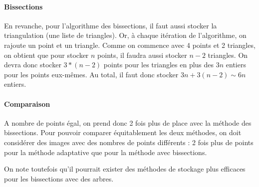 \documentclass{report}
\begin{document}
\paragraph{Bissections}

En revanche, pour l'algorithme des bissections, il faut aussi stocker la triangulation (une liste de triangles). Or, à chaque itération de l'algorithme, on rajoute un point et un triangle. Comme on commence avec 4 points et 2 triangles, on obtient que pour stocker $n$ points, il faudra aussi stocker $n-2$ triangles. On devra donc stocker $3*(n-2)$ points pour les triangles en plus des $3n$ entiers pour les points eux-mêmes. Au total, il faut donc stocker $3n + 3(n-2) \sim 6n$ entiers.

\paragraph{Comparaison}

A nombre de points égal, on prend donc 2 fois plus de place avec la méthode des bissections. Pour pouvoir comparer équitablement les deux méthodes, on doit considérer des images avec des nombres de points différents : 2 fois plus de points pour la méthode adaptative que pour la méthode avec bissections.

On note toutefois qu'il pourrait exister des méthodes de stockage plus efficaces pour les bissections avec des arbres.
\end{document}
